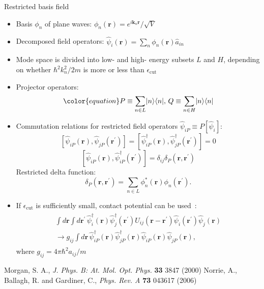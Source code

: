 \documentclass[final,hyperref={pdfpagelabels=false}]{beamer}
\begin{document}
\begin{frame}
\begin{columns}
{\begin{block}{Restricted basis field}

\begin{itemize}
	\item Basis $\phi_{n}$ of plane waves: $\phi_{n}(\mathbf{r}) = e^{i \mathbf{k}_n \mathbf{r}} / \sqrt{V}$
	\item Decomposed field operators: $\hat{\psi}_i(\mathbf{r}) = \sum\limits_n \phi_{n}(\mathbf{r}) \hat{a}_{in}$
	\item Mode space is divided into low- and high- energy subsets $L$ and $H$,
		depending on whether $\hbar^2 k_n^2 / 2 m $ is more or less than $\epsilon_{\textrm{cut}}$~\cite{norrie}
	\item Projector operators:	
\[ \color{equation} P \equiv \sum\limits_{n \in L} \lvert n \rangle \langle n \rvert,\,
Q \equiv \sum\limits_{n \in H} \lvert n \rangle \langle n \rvert \]
	\item Commutation relations for restricted field operators $\hat{\psi}_{iP} \equiv P[\hat{\psi}_i]$:
\[
\left[ \hat{\psi}_{iP}(\mathbf{r}), \hat{\psi}_{jP}(\mathbf{r}^\prime) \right] =
\left[ \hat{\psi}_{iP}^\dagger(\mathbf{r}), \hat{\psi}_{jP}^\dagger(\mathbf{r}^\prime) \right] = 0
\]
\[
\left[ \hat{\psi}_{iP}(\mathbf{r}), \hat{\psi}_{iP}^\dagger(\mathbf{r}^\prime) \right] = \delta_{ij} \delta_{P}(\mathbf{r}, \mathbf{r}^\prime)
\]
	Restricted delta function:
\[
\delta_{P}(\mathbf{r}, \mathbf{r}^\prime) = \sum\limits_{n \in L} \phi_{n}^* (\mathbf{r}) \phi_{n} (\mathbf{r}^\prime).
\]
	\item If $\epsilon_{\textrm{cut}}$ is sufficiently small, contact potential can be used~\cite{morgan}:
\begin{align*}
\begin{split}
\int d\mathbf{r} \int d\mathbf{r}^\prime \,
	\hat{\psi}_i^\dagger (\mathbf{r}) \hat{\psi}_j^\dagger (\mathbf{r}^\prime)
	U_{ij}(\mathbf{r} - \mathbf{r}^\prime)
	\hat{\psi}_i(\mathbf{r}^\prime) \hat{\psi}_j(\mathbf{r}) \\
\rightarrow g_{ij} \int d\mathbf{r} \,
	\hat{\psi}_{iP}^\dagger (\mathbf{r}) \hat{\psi}_{jP}^\dagger (\mathbf{r})
	\hat{\psi}_{iP}(\mathbf{r}) \hat{\psi}_{jP}(\mathbf{r}),
\end{split}
\end{align*}
	where $g_{ij} = 4 \pi \hbar^2 a_{ij} / m$

\end{itemize}

\tiny{ \begin{thebibliography}{9}
	 Morgan, S. A., \textit{J. Phys. B: At. Mol. Opt. Phys.} \textbf{33} 3847 (2000)
	 Norrie, A., Ballagh, R. and Gardiner, C., \textit{Phys. Rev. A} \textbf{73} 043617 (2006)
\end{thebibliography} }


\end{block}}
\end{columns}
\end{frame}
\end{document}
